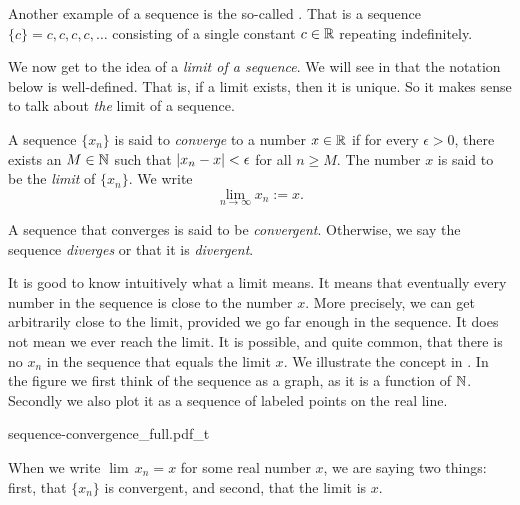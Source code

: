 Another example of a sequence is the so-called \emph{}.
That is a sequence $\{ c \} = c,c,c,c,\ldots$ consisting of a single
constant $c \in {\mathbb{R}}$ repeating indefinitely.

We now get to the idea of a
\emph{limit of a sequence}.  We will
see in 
that the notation below is well-defined.  That is, if a limit exists, then
it is unique.  So it makes sense to talk about \emph{the} limit of a sequence.

\begin{defn}
A sequence $\{ x_n \}$ is said to \emph{converge} to a number
$x \in {\mathbb{R}}$ if for every $\epsilon > 0$, there exists an $M \in {\mathbb{N}}$ such
that $\left\lvert {x_n - x} \right\rvert < \epsilon$ for all $n \geq M$.  The number $x$
is said to be the \emph{limit} of $\{ x_n \}$.  We write
\begin{equation*}
\lim_{n\to \infty} x_n := x .
\end{equation*}

A sequence
that converges is said to be \emph{convergent}.
Otherwise, we say the sequence \emph{diverges}
or that it is
\emph{divergent}.
\end{defn}

It is good to know intuitively what a limit means.  It means that eventually
every number in the sequence is close to the number $x$.  More precisely,
we can get arbitrarily close to the limit, provided we go far enough in the
sequence.  It does not mean we ever reach the limit.  It is possible,
and quite common, that there is no $x_n$ in the sequence that equals the
limit $x$.
We illustrate the concept in .  In the
figure we first think of the sequence as a graph, as it is a function of
${\mathbb{N}}$.   Secondly we also plot it as a sequence of labeled points on the real
line.

\begin{myfigureht}
{sequence-convergence_full.pdf_t}
\caption{Illustration of convergence.
On top, we show the first ten points of the sequence as a graph
with $M$ and the interval around the limit $x$ marked.
On bottom, the points of the same sequence are marked on the
number line.\label{figsequenceconvergence}}
\end{myfigureht}

When we write $\lim\, x_n = x$ for some real number $x$, we are saying two
things: first, that $\{ x_n \}$ is convergent, and second, that the limit is
$x$.

